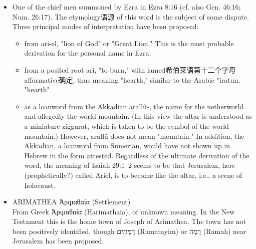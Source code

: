 \begin{itemize}
\begin{itemize}
\item One of the chief men summoned by Ezra in Ezra 8:16 (cf. also Gen. 46:16; Num. 26:17). The etymology语源 of this word is the subject of some dispute. Three principal modes of interpretation have been proposed: 
\begin{itemize} 
\itemsep-.25em 
\item from ari-el, "lion of God" or "Great Lion." This is the most probable derivation for the personal name in Ezra; 
\item from a posited root ari, "to burn," with lamed希伯莱语第十二个字母 afformative确定, thus meaning "hearth," similar to the Arabic ʿiratun, "hearth"
\item as a loanword from the Akkadian arallû-, the name for the netherworld and allegedly the world mountain. (In this view the altar is understood as a miniature ziggurat, which is taken to be the symbol of the world mountain.) However, arallû does not mean "mountain." In addition, the Akkadian, a loanword from Sumerian, would have not shown up in Hebrew in the form attested. Regardless of the ultimate derivation of the word, the meaning of Isaiah 29:1–2 seems to be that Jerusalem, here (prophetically?) called Ariel, is to become like the altar, i.e., a scene of holocaust.
\end{itemize} 
\item ARIMATHEA Ἁριμαθαία (Settlement) \\
From Greek Ἁριμαθαία (Harimathaia), of unknown meaning. In the New Testament this is the home town of Joseph of Arimathea. The town has not been positively identified, though רָמָתַיִם (Ramatayim) or רָמָה (Ramah) near Jerusalem has been proposed.
\end{itemize} 
\end{itemize} 

